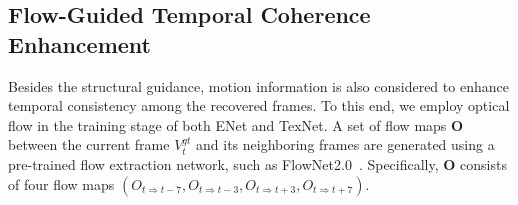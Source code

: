  

\subsection{Flow-Guided Temporal Coherence Enhancement}
\label{sec:fec}
Besides the structural guidance, motion information is also considered to enhance temporal consistency among the recovered frames.
To this end, we employ optical flow in the training stage of both ENet and TexNet.
%
A set of flow maps \(\boldsymbol{O}\) between the current frame $V_t^{gt}$ and its neighboring frames are generated using a pre-trained flow extraction network, such as FlowNet2.0~\cite{Flownet_2017_CVPR}.
Specifically, \(\boldsymbol{O}\) consists of four flow maps \((O_{t\Rightarrow t-7}, O_{t\Rightarrow t-3}, O_{t\Rightarrow t+3}, O_{t\Rightarrow t+7})\).



